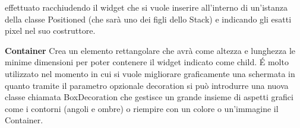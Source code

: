 \begin{trivlist}
		effettuato racchiudendo il widget che si vuole inserire all'interno di
		un'istanza della classe Positioned (che sarà uno dei figli dello Stack)
		e indicando gli esatti pixel nel suo costruttore. 
		\item \textbf{Container} \newline
		Crea un elemento rettangolare che avrà come altezza e lunghezza le
		minime dimensioni per poter contenere il widget indicato come child. \'E
		molto utilizzato nel momento in cui si vuole migliorare graficamente una
		schermata in quanto tramite il parametro opzionale decoration si può
		introdurre una nuova classe chiamata BoxDecoration che gestisce un
		grande insieme di aspetti grafici come i contorni (angoli e
		ombre) o riempire con un colore o un'immagine il Container.
	\end{trivlist}

